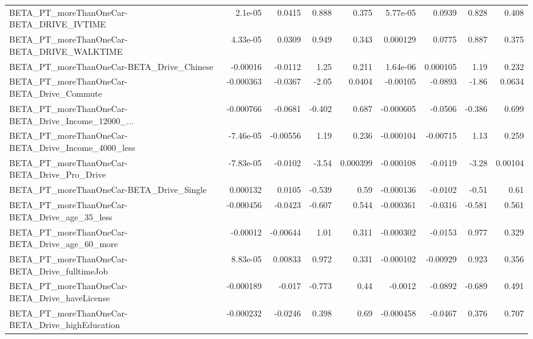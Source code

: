 \begin{tabular}{lrrrrrrrr}
BETA\_PT\_moreThanOneCar-BETA\_DRIVE\_IVTIME           &     2.1e-05 &       0.0415 &     0.888 &    0.375 &   5.77e-05 &      0.0939 &        0.828 &         0.408 \\
BETA\_PT\_moreThanOneCar-BETA\_DRIVE\_WALKTIME         &    4.33e-05 &       0.0309 &     0.949 &    0.343 &   0.000129 &      0.0775 &        0.887 &         0.375 \\
BETA\_PT\_moreThanOneCar-BETA\_Drive\_Chinese          &    -0.00016 &      -0.0112 &      1.25 &    0.211 &   1.64e-06 &    0.000105 &         1.19 &         0.232 \\
BETA\_PT\_moreThanOneCar-BETA\_Drive\_Commute          &   -0.000363 &      -0.0367 &     -2.05 &   0.0404 &   -0.00105 &     -0.0893 &        -1.86 &        0.0634 \\
BETA\_PT\_moreThanOneCar-BETA\_Drive\_Income\_12000\_... &   -0.000766 &      -0.0681 &    -0.402 &    0.687 &  -0.000605 &     -0.0506 &       -0.386 &         0.699 \\
BETA\_PT\_moreThanOneCar-BETA\_Drive\_Income\_4000\_less &   -7.46e-05 &     -0.00556 &      1.19 &    0.236 &  -0.000104 &    -0.00715 &         1.13 &         0.259 \\
BETA\_PT\_moreThanOneCar-BETA\_Drive\_Pro\_Drive        &   -7.83e-05 &      -0.0102 &     -3.54 & 0.000399 &  -0.000108 &     -0.0119 &        -3.28 &       0.00104 \\
BETA\_PT\_moreThanOneCar-BETA\_Drive\_Single           &    0.000132 &       0.0105 &    -0.539 &     0.59 &  -0.000136 &     -0.0102 &        -0.51 &          0.61 \\
BETA\_PT\_moreThanOneCar-BETA\_Drive\_age\_35\_less      &   -0.000456 &      -0.0423 &    -0.607 &    0.544 &  -0.000361 &     -0.0316 &       -0.581 &         0.561 \\
BETA\_PT\_moreThanOneCar-BETA\_Drive\_age\_60\_more      &    -0.00012 &     -0.00644 &      1.01 &    0.311 &  -0.000302 &     -0.0153 &        0.977 &         0.329 \\
BETA\_PT\_moreThanOneCar-BETA\_Drive\_fulltimeJob      &    8.83e-05 &      0.00833 &     0.972 &    0.331 &  -0.000102 &    -0.00929 &        0.923 &         0.356 \\
BETA\_PT\_moreThanOneCar-BETA\_Drive\_haveLicense      &   -0.000189 &       -0.017 &    -0.773 &     0.44 &    -0.0012 &     -0.0892 &       -0.689 &         0.491 \\
BETA\_PT\_moreThanOneCar-BETA\_Drive\_highEducation    &   -0.000232 &      -0.0246 &     0.398 &     0.69 &  -0.000458 &     -0.0467 &        0.376 &         0.707 \\

\end{tabular}
